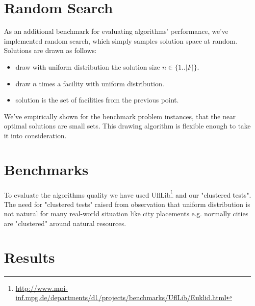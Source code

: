 \section{Random Search}

As an additional benchmark for evaluating algorithms' performance, we've implemented
random search, which simply samples solution space at random. Solutions are drawn as follows:
\begin{itemize}
\item draw with uniform distribution the solution size $n \in \{1..|F|\}$.
\item draw $n$ times a facility with uniform distribution.
\item solution is the set of facilities from the previous point.
\end{itemize}

We've empirically shown for the benchmark problem instances, that the near optimal
solutions are small sets. This drawing algorithm is flexible enough to take it
into consideration.

\section{Benchmarks}
To evaluate the algorithms quality we have used UflLib\footnote{\url{http://www.mpi-inf.mpg.de/departments/d1/projects/benchmarks/UflLib/Euklid.html}}
and our "clustered tests". The need for "clustered tests" raised from observation that
uniform distribution is not natural for many real-world situation like city placements
e.g. normally cities are "clustered" around natural resources.

\section{Results}
